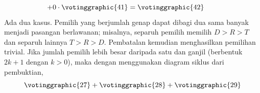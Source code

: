 \begin{exercises}
\begin{answer}
\begin{exparts}
\begin{equation*}
            +0\cdot\votinggraphic{41}
            =\votinggraphic{42}
          \tag*{}\end{equation*}
        \partsitem Ada dua kasus.
          Pemilih yang berjumlah genap dapat dibagi dua sama banyak menjadi pasangan berlawanan;
          misalnya, separuh pemilih memilih $D>R>T$ dan separuh lainnya $T>R>D$.
          Pembatalan kemudian menghasilkan pemilihan trivial.
          Jika jumlah pemilih lebih besar daripada satu dan ganjil (berbentuk
          $2k+1$ dengan $k>0$), maka dengan menggunakan diagram siklus dari pembuktian,
          \begin{equation*}
            \votinggraphic{27}  %
            +  
            \votinggraphic{28}  %
            +  
            \votinggraphic{29}  %

\end{equation*}
\end{exparts}
\end{answer}
\end{exercises}
